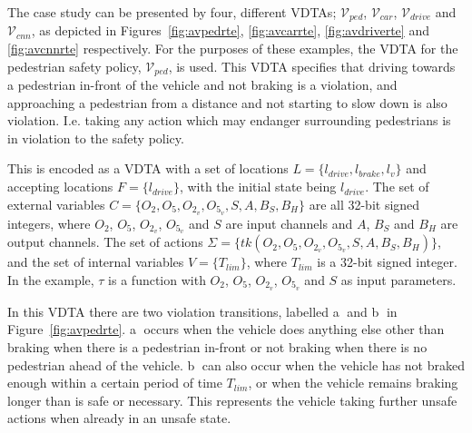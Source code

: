 \begin{example}
	The case study can be presented by four, different \acp{VDTA}; $\mathcal{V}_{ped}$, $\mathcal{V}_{car}$, $\mathcal{V}_{drive}$ and $\mathcal{V}_{cnn}$, as depicted in Figures~\ref{fig:avpedrte}, \ref{fig:avcarrte}, \ref{fig:avdriverte} and \ref{fig:avcnnrte} respectively. 
	For the purposes of these examples, the \ac{VDTA} for the pedestrian safety policy, $\mathcal{V}_{ped}$, is used.
	This \ac{VDTA} specifies that driving towards a pedestrian in-front of the vehicle and not braking is a violation, and approaching a pedestrian from a distance and not starting to slow down is also violation.
	I.e. taking any action which may endanger surrounding pedestrians is in violation to the safety policy.
	
	This is encoded as a \ac{VDTA} with a set of locations $L = \{l_{drive}, l_{brake}, l_v\}$ and accepting locations $F = \{l_{drive}\}$, with the initial state being $l_{drive}$.
	The set of external variables $C = \{O_2, O_5, O_{2_v}, O_{5_v}, S, A, B_S, B_H\}$ are all 32-bit signed integers, where $O_2$, $O_5$, $O_{2_v}$, $O_{5_v}$ and $S$ are input channels and $A$, $B_S$ and $B_H$ are output channels.
	The set of actions $\Sigma = \{tk(O_2, O_5, O_{2_v}, O_{5_v}, S, A, B_S, B_H)\}$, and the set of internal variables $V = \{T_{lim}\}$, where $T_{lim}$ is a 32-bit signed integer.
	In the example, $\tau$ is a function with $O_2$, $O_5$, $O_{2_v}$, $O_{5_v}$ and $S$ as input parameters. 
	
	In this \ac{VDTA} there are two violation transitions, labelled \textcircled{a} and \textcircled{b} in Figure~\ref{fig:avpedrte}.
	\textcircled{a} occurs when the vehicle does anything else other than braking when there is a pedestrian in-front or not braking when there is no pedestrian ahead of the vehicle.
	\textcircled{b} can also occur when the vehicle has not braked enough within a certain period of time $T_{lim}$, or when the vehicle remains braking longer than is safe or necessary.
	This represents the vehicle taking further unsafe actions when already in an unsafe state.
\end{example}


